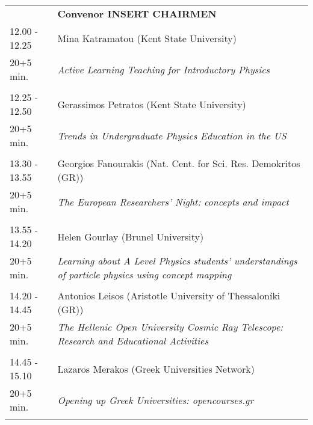 \begin{longtable}{p{3cm}p{13cm}}
&\hfill {\bf Convenor INSERT CHAIRMEN }\\ 
12.00 - 12.25 & Mina Katramatou (Kent State University)\\ 
20+5 min. & {\it Active Learning Teaching for Introductory Physics}\\ 
 & \\ 
12.25 - 12.50 & Gerassimos Petratos (Kent State University)\\ 
20+5 min. & {\it Trends in Undergraduate Physics Education in the US}\\ 
 & \\ 
13.30 - 13.55 & Georgios Fanourakis (Nat. Cent. for Sci. Res. Demokritos (GR))\\ 
20+5 min. & {\it The European Researchers' Night: concepts and impact}\\ 
 & \\ 
13.55 - 14.20 & Helen Gourlay (Brunel University)\\ 
20+5 min. & {\it Learning about A Level Physics students’ understandings of particle physics using concept mapping}\\ 
 & \\ 
14.20 - 14.45 & Antonios Leisos (Aristotle University of Thessaloníki (GR))\\ 
20+5 min. & {\it The Hellenic Open University Cosmic Ray Telescope: Research and Educational Activities}\\ 
 & \\ 
14.45 - 15.10 & Lazaros Merakos (Greek Universities Network)\\ 
20+5 min. & {\it Opening up Greek Universities: opencourses.gr}\\ 
 & \\ 
\end{longtable}

